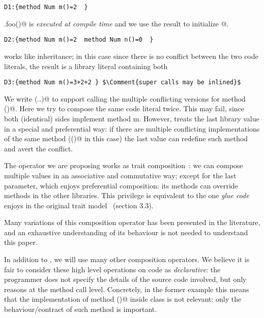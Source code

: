 \begin{lstlisting}
D1:{method Num m()=2  }  
\end{lstlisting}

\Q@C.foo()@ is \emph{executed at compile time}
and we use the result to initialize @.

\begin{lstlisting}
D2:{method Num m()=2  method Num n()=0  }  
\end{lstlisting}

\Q@Override@ works like inheritance; in this case since there is no conflict between
the two code literals, the result is a library literal containing both

\begin{lstlisting}
D3:{method Num m()=3+2+2 } $\Comment{super calls may be inlined}$
\end{lstlisting}

We write (..)@ to support calling the multiple conflicting versions
for method \Q@m()@.
Here we try to compose the same code literal twice.
This may fail, since both (identical) sides implement method m.
However, \Q@Override@ treats the last library value in a special
 and preferential way:
if there are multiple conflicting implementations of the same method 
(\Q@m()@ in this case)
the last value can redefine such method and avert the conflict.

The \Q@Override@ operator we are proposing works as 
trait composition~\cite{scharli2003traits}:
we can compose multiple \Q@Library@ values in
an associative and commutative way;
except for the last parameter, which
enjoys preferential composition:
its methods can override methods in the other
libraries. This privilege is equivalent to the 
one \emph{glue code} enjoys in the original trait model 
~\cite{scharli2003traits}(section 3.3).


Many variations of this composition operator has been presented in the literature,
and an exhaustive understanding of its behaviour is not needed to
understand this paper.

In addition to \Q@Override@, we will use many other composition operators.
We believe it is fair to consider these high level operations on code as \emph{declarative}:
 the programmer does not specify the details of the source code
involved, but only reasons at the method call level.
Concretely, in the former example this means that the implementation of method \Q@m()@
inside class \Q@C@ is not relevant: only the behaviour/contract of such method is important.



